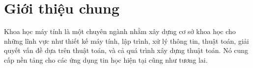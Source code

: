 
\chapter{Giới thiệu chung} 
\minitoc
\vspace{0.5cm}
\noindent
Khoa học máy tính là một chuyên ngành nhằm xây dựng cơ sở khoa học cho những lĩnh vực như
thiết kế máy tính, lập trình, xử lý thông tin, thuật toán, giải quyết vấn đề dựa
trên thuật toán, và cả quá trình xây dựng thuật toán. Nó cung cấp nền tảng cho các ứng
dụng tin học hiện tại cũng như tương lai.

 




  
